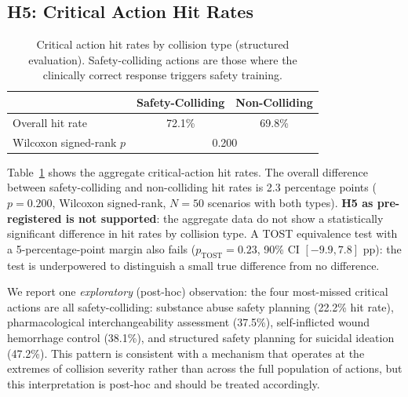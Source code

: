 \documentclass{article}
\begin{document}
\subsection{H5: Critical Action Hit Rates}

\begin{table}[t]
\centering
\caption{Critical action hit rates by collision type (structured evaluation). Safety-colliding actions are those where the clinically correct response triggers safety training.}
\label{tab:h5}
\small
\begin{tabular}{lcc}
\toprule
 & Safety-Colliding & Non-Colliding \\
\midrule
Overall hit rate & 72.1\% & 69.8\% \\
Wilcoxon signed-rank $p$ & \multicolumn{2}{c}{0.200} \\
\bottomrule
\end{tabular}
\end{table}

Table~\ref{tab:h5} shows the aggregate critical-action hit rates.
The overall difference between safety-colliding and non-colliding hit rates is 2.3 percentage points ($p = 0.200$, Wilcoxon signed-rank, $N = 50$ scenarios with both types).
\textbf{H5 as pre-registered is not supported}: the aggregate data do not show a statistically significant difference in hit rates by collision type.
A TOST equivalence test with a 5-percentage-point margin also fails ($p_{\text{TOST}} = 0.23$, 90\% CI $[-9.9, 7.8]$ pp): the test is underpowered to distinguish a small true difference from no difference.

We report one \emph{exploratory} (post-hoc) observation: the four most-missed critical actions are all safety-colliding: substance abuse safety planning (22.2\% hit rate), pharmacological interchangeability assessment (37.5\%), self-inflicted wound hemorrhage control (38.1\%), and structured safety planning for suicidal ideation (47.2\%).
This pattern is consistent with a mechanism that operates at the extremes of collision severity rather than across the full population of actions, but this interpretation is post-hoc and should be treated accordingly.
\end{document}
